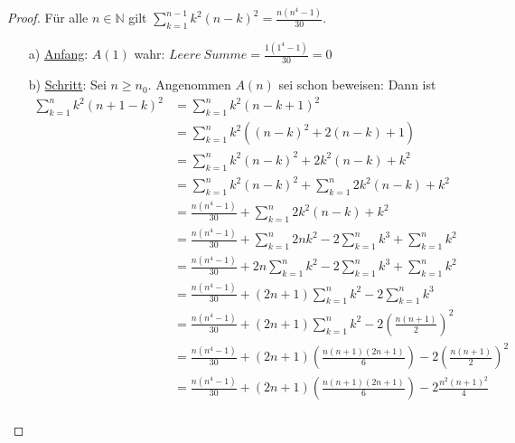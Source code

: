 \documentclass{../problemset}
\begin{document}
\begin{problem}[Summenformeln]
\begin{proof}
	Für alle $n \in \mathbb{N}$ gilt $\sum_{k = 1}^{n - 1} k^2(n - k)^2 = \frac{n(n^4 - 1)}{30}$.
	\begin{enumerate}
		\item[a)] \underline{Anfang}: $A(1)$ wahr: $Leere\ Summe = \frac{1(1^4 - 1)}{30} = 0$
		\item[b)] \underline{Schritt}: Sei $n \ge n_0$. Angenommen $A(n)$ sei schon beweisen: Dann ist
		      \begin{align}
			      \sum_{k = 1}^{n} k^2(n + 1 - k)^2 & = \sum_{k = 1}^{n} k^2(n - k + 1)^2                                                                       \\
			                                        & = \sum_{k = 1}^{n} k^2((n - k)^2 + 2(n-k)+ 1)                                                             \\
			                                        & = \sum_{k = 1}^{n} k^2(n - k)^2 + 2k^2(n-k) + k^2                                                         \\
			                                        & = \sum_{k = 1}^{n} k^2(n - k)^2 + \sum_{k=1}^{n} 2k^2(n-k) + k^2                                          \\
			                                        & = \frac{n(n^4 - 1)}{30} + \sum_{k=1}^{n} 2k^2(n-k) + k^2                                                  \\
			                                        & = \frac{n(n^4 - 1)}{30} + \sum_{k=1}^{n} 2nk^2 - 2\sum_{k=1}^{n} k^3 + \sum_{k=1}^{n} k^2                 \\
			                                        & = \frac{n(n^4 - 1)}{30} + 2n\sum_{k=1}^{n} k^2 - 2\sum_{k=1}^{n} k^3 + \sum_{k=1}^{n} k^2                 \\
			                                        & = \frac{n(n^4 - 1)}{30} + (2n+1)\sum_{k=1}^{n} k^2 - 2\sum_{k=1}^{n} k^3 \tag{aus 1.a}                    \\
			                                        & = \frac{n(n^4 - 1)}{30} + (2n+1)\sum_{k=1}^{n} k^2 - 2\left(\frac{n(n+1)}{2}\right)^2 \tag{aus Vorlesung} \\
			                                        & = \frac{n(n^4 - 1)}{30} + (2n+1)\left(\frac{n(n+1)(2n+1)}{6}\right) - 2\left(\frac{n(n+1)}{2}\right)^2    \\
			                                        & = \frac{n(n^4 - 1)}{30} + (2n+1)\left(\frac{n(n+1)(2n+1)}{6}\right) - 2\frac{n^2(n+1)^2}{4}               \\

\end{align}
\end{enumerate}
\end{proof}
\end{problem}
\end{document}
